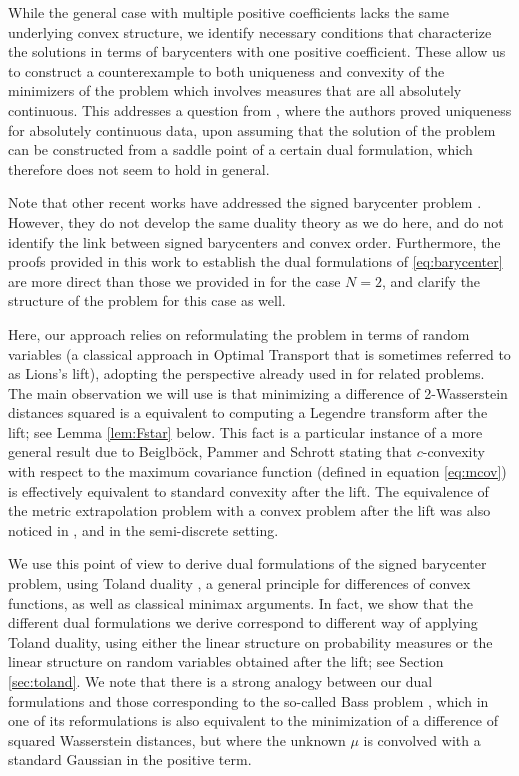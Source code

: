 \documentclass[12pt]{amsart}
\numberwithin{equation}{section}
\theoremstyle{plain}
\theoremstyle{definition}
\begin{document}
While the general case with multiple positive coefficients lacks the same underlying convex structure, we identify necessary conditions that characterize the solutions in terms of barycenters with one positive coefficient. These allow us to construct a counterexample to both uniqueness and convexity of the minimizers of the problem which involves measures that are all absolutely continuous. This addresses a question from \cite{jacobs2026signed}, where the authors proved uniqueness for absolutely continuous data, upon assuming that the solution of the problem can be constructed from a saddle point of a certain dual formulation, which therefore does not seem to hold in general. 

Note that other recent works have addressed the signed barycenter problem \cite{tornabene2024generalized,jacobs2026signed}. However, they do not develop the same duality theory as we do here, and do not identify the link between signed barycenters and convex order. Furthermore, the proofs provided in this work to establish the dual formulations of \eqref{eq:barycenter} are more direct than those we provided in \cite{gallouet2025metric} for the case $N=2$, and clarify the structure of the problem for this case as well. 

Here, our approach relies on reformulating the problem in terms of random variables (a classical approach in Optimal Transport that is sometimes referred to as Lions's lift), adopting the perspective already used in \cite{ekeland2014optimal,bertucci2024approximation,beiglbock2025brenier,pinzi2025totally} for related problems. The main observation we will use is that minimizing a difference of 2-Wasserstein distances squared is a equivalent to computing a Legendre transform after the lift; see Lemma \ref{lem:Fstar} below. This fact is a particular instance of a more general result due to Beiglb\"ock, Pammer and Schrott \cite{beiglbock2025brenier} stating that $c$-convexity with respect to the maximum covariance function (defined in equation \eqref{eq:mcov}) is effectively equivalent to standard convexity after the lift.  The equivalence of the metric extrapolation problem with a convex problem after the lift was also noticed in \cite{bertucci2024approximation}, and \cite[Remark 5.3]{bourne2026semidiscrete} in the semi-discrete setting. 

We use this point of view to derive dual formulations of the signed barycenter problem, using 
Toland duality \cite{toland1978duality}, a general principle for differences of convex functions, as well as classical minimax arguments. In fact, we show that the different dual formulations we derive correspond to different way of applying Toland duality, using either the linear structure on probability measures or the linear structure on random variables obtained after the lift; see Section \ref{sec:toland}. We note that there is a strong analogy between our dual formulations and those corresponding to the so-called Bass problem  \cite{backhoff2024gradient,BackhoffVeraguas2025Bass}, which in one of its reformulations is also equivalent to the minimization of a difference of squared Wasserstein distances, but where the unknown $\mu$ is convolved with a standard Gaussian in the positive term.
\end{document}
